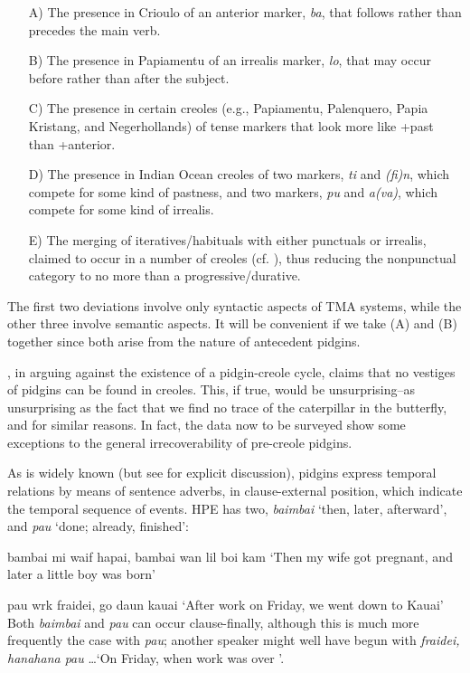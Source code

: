 \begin{itemize}\label{majordeviations}
\item[A)] The presence in Crioulo of an anterior marker, \textit{ba}, that follows rather than precedes the main verb.
\item[B)] The presence in Papiamentu of an irrealis marker, \textit{lo}, that may occur before rather than after the subject.
\item[C)] The presence in certain creoles (e.g., Papiamentu, Palenquero, Papia Kristang, and Negerhollands) of tense markers that look more like +past than +anterior.
\item[D)] The presence in Indian Ocean creoles of two markers, \textit{ti} and \textit{(fi)n}, which compete for some kind of pastness, and two markers, \textit{pu} and \textit{a(va)}, which compete for some kind of irrealis.
\item[E)] The merging of iteratives/habituals with either punctuals or irrealis, claimed to occur in a number of creoles (cf. \citealt{Taylor1971}), thus reducing the nonpunctual category to no more than a progressive/durative.
\end{itemize}

The first two deviations involve only syntactic aspects of TMA systems, while the other three involve semantic aspects. It will be convenient if we take (A) and (B) together since both arise from the nature of antecedent pidgins.

\citet{Alleyne1979}, in arguing against the existence of a pidgin-creole cycle, claims that no vestiges of pidgins can be found in creoles. This, if true, would be unsurprising--as unsurprising as the fact that we find no trace of the caterpillar in the butterfly, and for similar reasons. In fact, the data now to be surveyed show some exceptions to the general irrecoverability of pre-creole pidgins.

As is widely known (but see \citet{Labov1971} for explicit discussion), pidgins express temporal relations by means of sentence adverbs, in clause-external position, which indicate the temporal sequence of events. HPE has two, \textit{baimbai} `then, later, afterward', and \textit{pau} `done; already, finished':

\ea\label{ex:2:92}
 {bambai} {mi} {waif} {hapai,} {bambai} {wan} {lil} {boi} {kam}
\glt `Then my wife got pregnant, and later a little boy was born'
\z

\ea\label{ex:2:93}
pau wrk fraidei, go daun kauai
\glt `After work on Friday, we went down to Kauai'
\z
Both \textit{baimbai }and \textit{pau }can occur clause-finally, although this is much more frequently the case with \textit{pau}; another speaker might well have begun  with \textit{fraidei, hanahana pau} \ldots\xspace `On Friday, when work was over \textellipsis'.

